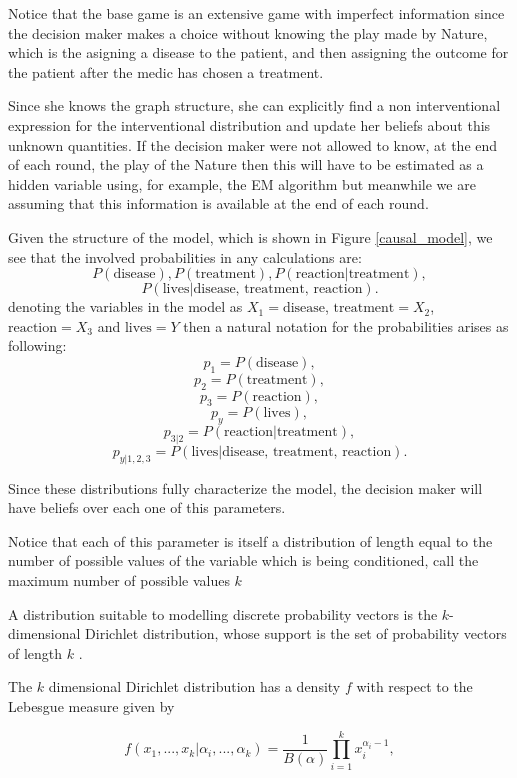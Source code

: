 \documentclass{article}
\begin{document}
Notice that the base game is an extensive game with imperfect information since the decision maker makes a choice without knowing the play made by Nature, which is the asigning a disease to the patient, and then assigning the outcome for the patient after the medic has chosen a treatment. 

Since she knows the graph structure, she can explicitly find a non interventional expression for the interventional distribution and update her beliefs about this unknown quantities. If the decision maker were not allowed to know, at the end of each round, the play of the Nature then this will have to be estimated as a hidden variable using, for example, the EM algorithm \cite{dempster1977maximum} but meanwhile we are assuming that this information is available at the end of each round.

Given the structure of the model, which is shown in Figure \ref{causal_model}, we see that the involved probabilities in any calculations are:
\[ P(\textrm{disease}), P(\textrm{treatment}), P(\textrm{reaction} | \textrm{treatment}), \]
\[P(\textrm{lives} | \textrm{disease, treatment, reaction}). \]
denoting the variables in the model as $X_1 = \textrm{disease}$, $\textrm{treatment}=X_2$, $\textrm{reaction}=X_3$ and $\textrm{lives}=Y$ then a natural notation for the probabilities arises as following:
\[ p_1 = P(\textrm{disease}), \]
\[ p_2 = P(\textrm{treatment}), \]
\[ p_3 = P(\textrm{reaction}),\]
\[p_y= P(\textrm{lives}), \]
\[ p_{3 | 2} = P(\textrm{reaction} | \textrm{treatment}), \]
\[p_{y |1,2,3} = P(\textrm{lives} | \textrm{disease, treatment, reaction}). \]

Since these distributions fully characterize the model, the decision maker will have beliefs over each one of this parameters. 

Notice that each of this parameter is itself a distribution of length equal to the number of possible values of the variable which is being conditioned, call the maximum number of possible values $k$ 

A distribution suitable to modelling discrete probability vectors is the $k$-dimensional Dirichlet distribution, whose support is the set of probability vectors of length $k$ \cite{hjort2010bayesian}. 

The $k$ dimensional Dirichlet distribution has a density $f$ with respect to the Lebesgue measure given by

\[ f(x_1,...,x_k | \alpha_i,...,\alpha_k)=\frac{1}{B(\alpha)}  \prod_{i=1}^k x_i^{\alpha_i-1},\]
\end{document}
